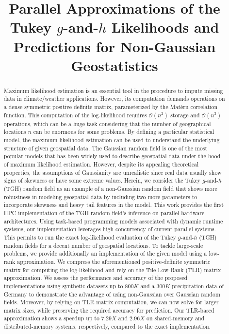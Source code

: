 \documentclass[conference]{IEEEtran}
\begin{document}
\title{Parallel Approximations of the Tukey $g$-and-$h$  Likelihoods and Predictions for Non-Gaussian Geostatistics}




\maketitle

\begin{abstract}

Maximum likelihood estimation is an essential tool in
the procedure to impute missing data in climate/weather
applications. However, its computation demands operations
on a dense symmetric positive definite matrix, parameterized by
the Mat\'ern correlation function. This computation of the log-likelihood requires $\mathcal{O}(n^2)$ storage 
and $\mathcal{O}(n^3)$ operations, which can be a 
huge task considering that the number of geographical 
locations $n$ can be enormous for some problems.  
By defining a particular statistical model, the maximum likelihood estimation can be used to understand the underlying
structure of given geospatial data. The Gaussian random field 
is one of the most popular models that has been widely used 
to describe geospatial data under the hood of maximum likelihood estimation. However, despite its appealing theoretical properties, the assumptions of Gaussianity are unrealistic since real data usually
show signs of skewness or have some extreme values. Herein, we consider the Tukey $g$-and-$h$ (TGH) random field as an example
of a non-Gaussian random field that shows more robustness in modeling geospatial data by including two more parameters 
to incorporate skewness and heavy tail features in the model. 
This work provides the first HPC implementation of the TGH 
random field's inference on parallel hardware architectures. 
Using task-based programming models associated with dynamic runtime systems,
our implementation leverages high concurrency of current parallel systems.
This permits to run the exact log-likelihood evaluation of the Tukey $g$-and-$h$ (TGH) random fields 
for a decent number of geospatial locations.
To tackle large-scale problems, we provide additionally an implementation of the given model 
using a low-rank approximation. We compress the aforementioned positive-definite symmetric matrix for computing the 
log-likelihood and rely on the Tile Low-Rank (TLR) matrix
approximation. We assess the performance and accuracy of the proposed implementations using synthetic 
datasets up to $800K$ and a $300K$ precipitation data of Germany to demonstrate the advantage 
of using non-Gaussian over Gaussian random fields. Moreover, by relying on TLR matrix computation, we 
can now solve for larger matrix sizes, while preserving the required accuracy for prediction. Our TLR-based approximation shows a 
speedup up to $7.29X$ and $2.96X$ on shared-memory and distributed-memory systems, respectively, compared
to the exact implementation. %
\end{abstract}
\end{document}
